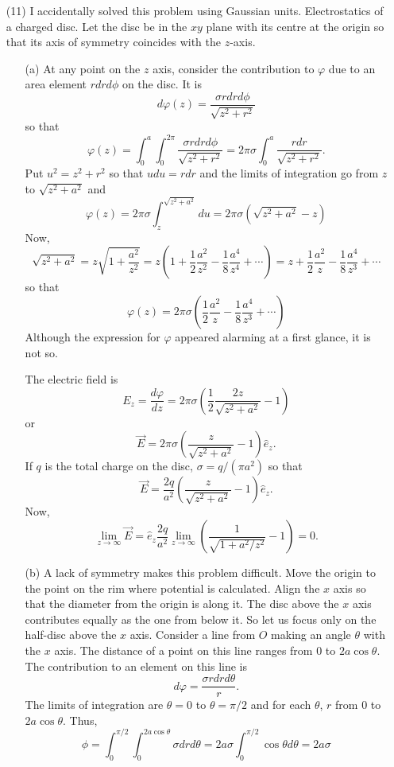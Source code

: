 \documentclass{article}
\newcommand{\uv}[1]{\hat{e}_{#1}}
\newcommand{\td}[2]{\frac{d{#1}}{d{#2}}}
\begin{document}
\begin{enumerate}
\item[(11)] {\color{red}I accidentally solved this problem using Gaussian units.}
Electrostatics of a charged disc. Let the disc be in the $xy$ plane with
its centre at the origin so that its axis of symmetry coincides with the $z$-axis.
\begin{enumerate}
\item[(a)] At any point on the $z$ axis, consider the contribution to $\varphi$ due
to an area element $rdrd\phi$ on the disc. It is
\[
d\varphi(z) = \frac{\sigma rdrd\phi}{\sqrt{z^2 + r^2}}
\]
so that
\[
\varphi(z) = \int_0^a\int_0^{2\pi}\frac{\sigma rdrd\phi}{\sqrt{z^2 + r^2}}
= 2\pi\sigma\int_0^a \frac{rdr}{\sqrt{z^2 + r^2}}.
\]
Put $u^2 = z^2 + r^2$ so that $udu = rdr$ and the limits of integration go
from $z$ to $\sqrt{z^2 + a^2}$ and
\[
\varphi(z) = 2\pi\sigma\int_z^{\sqrt{z^2 + a^2}} du = 2\pi\sigma(\sqrt{z^2 + a^2} - z)
\]
Now, 
\[
\sqrt{z^2 + a^2} = z\sqrt{1 + \frac{a^2}{z^2}} = z\left(1 + \frac{1}{2}\frac{a^2}{z^2}
- \frac{1}{8}\frac{a^4}{z^4} + \cdots\right) = z + \frac{1}{2}\frac{a^2}{z}
- \frac{1}{8}\frac{a^4}{z^3} + \cdots
\]
so that
\[
\varphi(z) = 2\pi\sigma\left(\frac{1}{2}\frac{a^2}{z} - \frac{1}{8}\frac{a^4}{z^3}
 + \cdots\right)
\]
Although the expression for $\varphi$ appeared alarming at a first glance, it is 
not so.

The electric field is
\[
E_z = \td{\varphi}{z} = 2\pi\sigma\left(\frac{1}{2}\frac{2z}{\sqrt{z^2 + a^2}} - 1\right)
\]
or
\[
\vec{E} = 2\pi\sigma\left(\frac{z}{\sqrt{z^2 + a^2}} - 1\right)\uv{z}.
\]
If $q$ is the total charge on the disc, $\sigma = q/(\pi a^2)$ so that
\[
\vec{E} = \frac{2q}{a^2}\left(\frac{z}{\sqrt{z^2 + a^2}} - 1\right)\uv{z}.
\]
Now,
\[
\lim_{z \rightarrow \infty}\vec{E} = \uv{z}\frac{2q}{a^2}\lim_{z \rightarrow \infty}
\left(\frac{1}{\sqrt{1 + a^2/z^2}} - 1\right) = 0.
\]

\item[(b)] A lack of symmetry makes this problem difficult. Move the origin to
the point on the rim where potential is calculated. Align the $x$ axis so that
the diameter from the origin is along it. The disc above the $x$ axis contributes
equally as the one from below it. So let us focus only on the half-disc above
the $x$ axis. Consider a line from $O$ making an angle $\theta$ with the $x$
axis. The distance of a point on this line ranges from $0$ to $2a\cos\theta$.
The contribution to an element on this line is
\[
d\varphi = \frac{\sigma rdrd\theta}{r}.
\]
The limits of integration are $\theta = 0$ to $\theta = \pi/2$ and for each
$\theta$, $r$ from $0$ to $2a\cos\theta$. Thus,
\[
\phi = \int_0^{\pi/2}\int_0^{2a\cos\theta}\sigma dr d\theta = 2a\sigma
\int_0^{\pi/2} \cos\theta d\theta = 2a\sigma
\]
\end{enumerate}

\end{enumerate}
\end{document}
